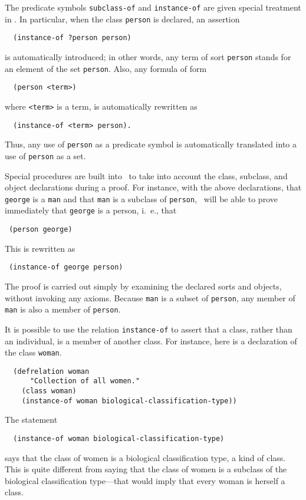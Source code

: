 The predicate symbols \verb'subclass-of' and \verb'instance-of' are given
special treatment in \snark\/.   In particular, when the class \verb'person'
is declared, an assertion
\begin{verbatim}
  (instance-of ?person person)
\end{verbatim}
is automatically introduced; in other words, any term of sort \verb'person'
stands for an element of the set \verb'person'.  Also, any formula of form

\begin{verbatim}
  (person <term>)
\end{verbatim}
where \verb'<term>' is a term, is automatically rewritten as
\begin{verbatim}
  (instance-of <term> person).
\end{verbatim}
Thus, any use of \verb'person' as a predicate symbol is automatically
translated into a use of \verb'person' as a set.

Special procedures are built into \snark\  to take into account the
class, subclass, and object declarations during a proof.  For instance,
with the above declarations, that \verb'george' is a \verb'man' and that
\verb'man' is a subclass of \verb'person', \snark\  will be able to prove
immediately that \verb'george' is a person, i.\  e., that
\begin{verbatim}
 (person george)
\end{verbatim}
This is rewritten as
\begin{verbatim}
 (instance-of george person)
\end{verbatim}

The proof is carried out simply by examining the declared sorts and objects,
without invoking any axioms.  Because \verb'man' is a subset of
\verb'person', any member of \verb'man' is also a member of \verb'person'.

It is possible to use the relation \verb'instance-of' to assert that a class,
rather than an individual, is a member of another class.  For instance, here
is a declaration of the class \verb'woman'.

\begin{verbatim}
  (defrelation woman
      "Collection of all women."
    (class woman)
    (instance-of woman biological-classification-type))
\end{verbatim}
The statement
\begin{verbatim}
  (instance-of woman biological-classification-type)
\end{verbatim}
says that the class of women is a biological classification type, a kind of
class.  This is quite different from saying that the class of women is a
subclass of the biological classification type---that would imply that every
woman is herself a class.


